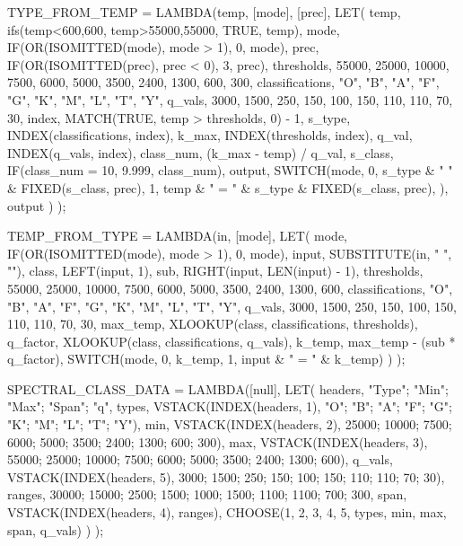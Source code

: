 TYPE_FROM_TEMP = LAMBDA(temp, [mode], [prec],
    LET(
        temp, ifs(temp<600,600,
                temp>55000,55000,
                TRUE, temp),
        mode, IF(OR(ISOMITTED(mode), mode > 1), 0, mode),
        prec, IF(OR(ISOMITTED(prec), prec < 0), 3, prec),
        thresholds, {55000, 25000, 10000, 7500, 6000, 5000, 3500, 2400, 1300, 600, 300},
        classifications, {"O", "B", "A", "F", "G", "K", "M", "L", "T", "Y"},
        q_vals, {3000, 1500, 250, 150, 100, 150, 110, 110, 70, 30},
        index, MATCH(TRUE, temp > thresholds, 0) - 1,
        s_type, INDEX(classifications, index),
        k_max, INDEX(thresholds, index),
        q_val, INDEX(q_vals, index),
        class_num, (k_max - temp) / q_val,
        s_class, IF(class_num = 10, 9.999, class_num),
        output, SWITCH(mode,
            0, s_type & " " & FIXED(s_class, prec),
            1, temp & " = " & s_type & FIXED(s_class, prec), ),
        output
    )
);

TEMP_FROM_TYPE = LAMBDA(in, [mode],
    LET(
        mode, IF(OR(ISOMITTED(mode), mode > 1), 0, mode),
        input, SUBSTITUTE(in, " ", ""),
        class, LEFT(input, 1),
        sub, RIGHT(input, LEN(input) - 1),
        thresholds, {55000, 25000, 10000, 7500, 6000, 5000, 3500, 2400, 1300, 600},
        classifications, {"O", "B", "A", "F", "G", "K", "M", "L", "T", "Y"},
        q_vals, {3000, 1500, 250, 150, 100, 150, 110, 110, 70, 30},
        max_temp, XLOOKUP(class, classifications, thresholds),
        q_factor, XLOOKUP(class, classifications, q_vals),
        k_temp, max_temp - (sub * q_factor),
        SWITCH(mode, 0, k_temp, 1, input & " = " & k_temp)
    )
);

SPECTRAL_CLASS_DATA = LAMBDA([null],
    LET(
        headers, {"Type"; "Min"; "Max"; "Span"; "q"},
        types, VSTACK(INDEX(headers, 1), {"O"; "B"; "A"; "F"; "G"; "K"; "M"; "L"; "T"; "Y"}),
        min, VSTACK(INDEX(headers, 2), {25000; 10000; 7500; 6000; 5000; 3500; 2400; 1300; 600; 300}),
        max, VSTACK(INDEX(headers, 3), {55000; 25000; 10000; 7500; 6000; 5000; 3500; 2400; 1300; 600}),
        q_vals, VSTACK(INDEX(headers, 5), {3000; 1500; 250; 150; 100; 150; 110; 110; 70; 30}),
        ranges, {30000; 15000; 2500; 1500; 1000; 1500; 1100; 1100; 700; 300},
        span, VSTACK(INDEX(headers, 4), ranges),
        CHOOSE({1, 2, 3, 4, 5}, types, min, max, span, q_vals)
    )
);